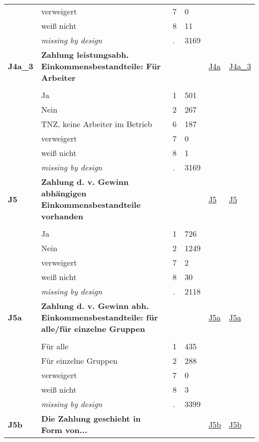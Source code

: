 \begin{longtable}{| L{2.45cm} | L{6cm} | C{1.5cm} | R{1cm} | C{2.25cm} | C{2.25cm} |}
   & verweigert & 7 & 0 &  &  \\ 
   & weiß nicht & 8 & 11 &  &  \\ 
   & \textit{missing by design} & \textit{.} & 3169 &  &  \\ 
   \midrule
\textbf{J4a\_3}\label{var:J4a:3} & \textbf{Zahlung leistungsabh. Einkommensbestandteile: Für Arbeiter} &  &  & \hyperref[J4a]{J4a} & \hyperref[var:suf:J4a:3]{J4a\_3} \\ 
   &  &  &  &  &  \\ 
   & Ja & 1 & 501 &  &  \\ 
   & Nein & 2 & 267 &  &  \\ 
   & TNZ, keine Arbeiter im Betrieb & 6 & 187 &  &  \\ 
   & verweigert & 7 & 0 &  &  \\ 
   & weiß nicht & 8 & 1 &  &  \\ 
   & \textit{missing by design} & \textit{.} & 3169 &  &  \\ 
   \midrule
\textbf{J5}\label{var:J5} & \textbf{Zahlung d. v. Gewinn abhängigen Einkommensbestandteile vorhanden} &  &  & \hyperref[J5]{J5} & \hyperref[var:suf:J5]{J5} \\ 
   &  &  &  &  &  \\ 
   & Ja & 1 & 726 &  &  \\ 
   & Nein & 2 & 1249 &  &  \\ 
   & verweigert & 7 & 2 &  &  \\ 
   & weiß nicht & 8 & 30 &  &  \\ 
   & \textit{missing by design} & \textit{.} & 2118 &  &  \\ 
   \midrule
\textbf{J5a}\label{var:J5a} & \textbf{Zahlung d. v. Gewinn abh. Einkommensbestandteile: für alle/für einzelne Gruppen} &  &  & \hyperref[J5a]{J5a} & \hyperref[var:suf:J5a]{J5a} \\ 
   &  &  &  &  &  \\ 
   & Für alle & 1 & 435 &  &  \\ 
   & Für einzelne Gruppen & 2 & 288 &  &  \\ 
   & verweigert & 7 & 0 &  &  \\ 
   & weiß nicht & 8 & 3 &  &  \\ 
   & \textit{missing by design} & \textit{.} & 3399 &  &  \\ 
   \midrule
\textbf{J5b}\label{var:J5b} & \textbf{Die Zahlung geschieht in Form von...} &  &  & \hyperref[J5b]{J5b} & \hyperref[var:suf:J5b]{J5b} \\ 

\end{longtable}
